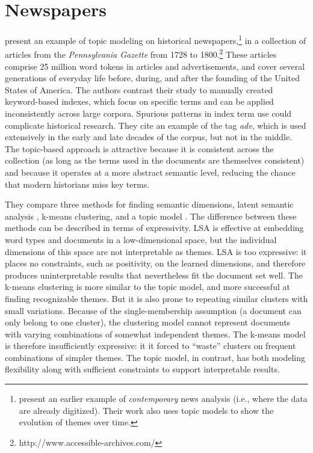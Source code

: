 
\section{Newspapers}

\citet{newman-06} present an example of topic modeling on historical newspapers,\footnote{\citet{mei-05} present an earlier example of \emph{contemporary} news analysis (i.e., where the data are already digitized).  Their work also uses topic models to show the evolution of themes over time.} in a collection of articles from the {\em Pennsylvania Gazette} from 1728 to 1800.\footnote{http://www.accessible-archives.com/}
These articles comprise 25 million word tokens in articles and advertisements, and cover several generations of everyday life before, during, and after the founding of the United States of America.
The authors contrast their study to manually created keyword-based indexes, which focus on specific terms and can be applied inconsistently across large corpora.
Spurious patterns in index term use could complicate historical research.
They cite an example of the tag {\em adv}, which is used extensively in the early and late decades of the corpus, but not in the middle.
The topic-based approach is attractive because it is consistent across the collection (as long as the terms used in the documents are themselves consistent) and because it operates at a more abstract semantic level, reducing the chance that modern historians miss key terms.

They compare three methods for finding semantic dimensions, latent semantic analysis \citep{deerwester-90}, k-means clustering, and a topic model \citep{hofmann-99}.
The difference between these methods can be described in terms of expressivity.
LSA is effective at embedding word types and documents in a low-dimensional space, but the individual dimensions of this space are not interpretable as themes.
LSA is too expressive: it places no constraints, such as positivity, on the learned dimensions, and therefore produces uninterpretable results that nevertheless fit the document set well.
The k-means clustering is more similar to the topic model, and more successful at finding recognizable themes.
But it is also prone to repeating similar clusters with small variations.
Because of the single-membership assumption (a document can only belong to one cluster), the clustering model cannot represent documents with varying combinations of somewhat independent themes.
The k-means model is therefore insufficiently expressive: it it forced to ``waste'' clusters on frequent combinations of simpler themes.
The topic model, in contrast, has both modeling flexibility along with sufficient  constraints to support interpretable results.

